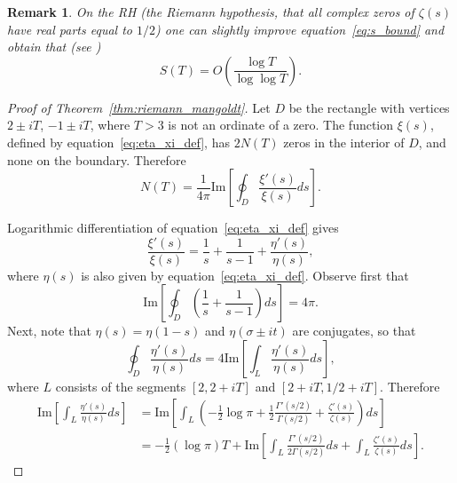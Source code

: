 \documentclass[11pt]{article}
\newtheorem{remark}[theorem]{Remark}
\begin{document}
\begin{remark}\label{rem:s_rh}
On the RH (the Riemann hypothesis, that all complex zeros of $\zeta(s)$ have real parts equal to $1/2$) one can slightly improve equation~\eqref{eq:s_bound} and obtain that (see \cite{Tit3})
\begin{equation}\label{eq:s_rh_bound}
S(T) = O\left(\frac{\log T}{\log \log T}\right).
\end{equation}
\end{remark}

\begin{proof}[Proof of Theorem~\ref{thm:riemann_mangoldt}]
Let $D$ be the rectangle with vertices $2 \pm iT$, $-1 \pm iT$, where $T > 3$ is not an ordinate of a zero. The function $\xi(s)$, defined by equation~\eqref{eq:eta_xi_def}, has $2N(T)$ zeros in the interior of $D$, and none on the boundary. Therefore
\begin{equation}\label{eq:contour_integral}
N(T) = \frac{1}{4\pi} \text{Im} \left[ \oint_D \frac{\xi'(s)}{\xi(s)} ds \right].
\end{equation}

Logarithmic differentiation of equation~\eqref{eq:eta_xi_def} gives
\begin{equation}\label{eq:xi_log_deriv}
\frac{\xi'(s)}{\xi(s)} = \frac{1}{s} + \frac{1}{s-1} + \frac{\eta'(s)}{\eta(s)},
\end{equation}
where $\eta(s)$ is also given by equation~\eqref{eq:eta_xi_def}. Observe first that
\begin{equation}\label{eq:pole_contribution}
\text{Im} \left[ \oint_D \left( \frac{1}{s} + \frac{1}{s-1} \right) ds \right] = 4\pi.
\end{equation}
Next, note that $\eta(s) = \eta(1-s)$ and $\eta(\sigma \pm it)$ are conjugates, so that
\begin{equation}\label{eq:eta_symmetry}
\oint_D \frac{\eta'(s)}{\eta(s)} ds = 4 \text{Im} \left[ \int_L \frac{\eta'(s)}{\eta(s)} ds \right],
\end{equation}
where $L$ consists of the segments $[2, 2+iT]$ and $[2+iT, 1/2+iT]$. Therefore
\begin{align}\label{eq:eta_integral}
\text{Im} \left[ \int_L \frac{\eta'(s)}{\eta(s)} ds \right] &= \text{Im} \left[ \int_L \left( -\frac{1}{2} \log \pi + \frac{1}{2} \frac{\Gamma'(s/2)}{\Gamma(s/2)} + \frac{\zeta'(s)}{\zeta(s)} \right) ds \right] \\
&= -\frac{1}{2}(\log \pi) T + \text{Im} \left[ \int_L \frac{\Gamma'(s/2)}{2\Gamma(s/2)} ds + \int_L \frac{\zeta'(s)}{\zeta(s)} ds \right]. \nonumber
\end{align}


\end{proof}
\end{document}
